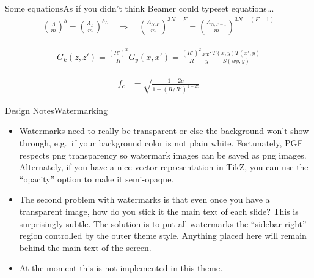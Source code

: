\begin{frame}[c]{Some equations}{As if you didn't think Beamer could typeset equations...}
	\begin{align*}
		\left(\frac{\Lambda}{m}\right)^b = \left(\frac{\Lambda_L}{m}\right)^{b_L} \quad\Rightarrow\quad \left(\frac{\Lambda_{N,F}}{m}\right)^{3N-F}=\left(\frac{\Lambda_{N,F-1}}{m}\right)^{3N-(F-1)}
	\end{align*}

	\begin{align*}
		G_k(z,z') = \frac{(R')^2}{R} G_y(x,x') = \frac{(R')^2}{R} \frac{xx'}{y} \frac{T(x,y)T(x',y)}{S(wy,y)}
	\end{align*}

	\begin{align*}
	f_c &=\sqrt{\frac{1-2c}{1-(R/R')^{1-2c}}}
	\end{align*}

\end{frame}






\begin{frame}[t]{Design Notes}{Watermarking}
	\begin{itemize}
		\item Watermarks need to really be \alert{transparent} or else the background won't show through, e.g.\ if your background color is not plain white. Fortunately, PGF respects png transparency so watermark images can be saved as png images. Alternately, if you have a nice vector representation in TikZ, you can use the ``opacity'' option to make it semi-opaque.
		\item The second problem with watermarks is that even once you have a transparent image, how do you stick it  the main text of each slide? This is surprisingly subtle. The solution is to put all watermarks the ``sidebar right'' region controlled by the outer theme style. Anything placed here will remain \alert{behind} the main text of the screen.
		\item At the moment this is not implemented in this theme.
	\end{itemize}
\end{frame}





